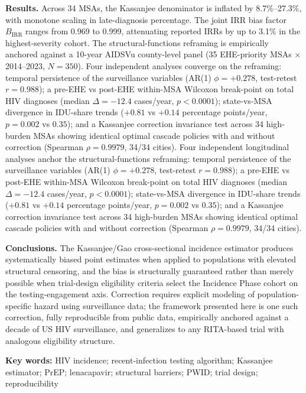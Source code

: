 \documentclass[12pt]{article}
\begin{document}
\medskip
\noindent\textbf{Results.} Across 34 MSAs, the Kassanjee denominator is inflated by 8.7\%--27.3\%, with monotone scaling in late-diagnosis percentage. The joint IRR bias factor $B_{\mathrm{IRR}}$ ranges from 0.969 to 0.999, attenuating reported IRRs by up to 3.1\% in the highest-severity cohort. The structural-functions reframing is empirically anchored against a 10-year AIDSVu county-level panel (35 EHE-priority MSAs $\times$ 2014--2023, $N = 350$). Four independent analyses converge on the reframing: temporal persistence of the surveillance variables (AR(1) $\phi = +0.278$, test-retest $r = 0.988$); a pre-EHE vs post-EHE within-MSA Wilcoxon break-point on total HIV diagnoses (median $\Delta = -12.4$ cases/year, $p < 0.0001$); state-vs-MSA divergence in IDU-share trends ($+0.81$ vs $+0.14$ percentage points/year, $p = 0.002$ vs $0.35$); and a Kassanjee correction invariance test across 34 high-burden MSAs showing identical optimal cascade policies with and without correction (Spearman $\rho = 0.9979$, 34/34 cities). Four independent longitudinal analyses anchor the structural-functions reframing: temporal persistence of the surveillance variables (AR(1) $\phi = +0.278$, test-retest $r = 0.988$); a pre-EHE vs post-EHE within-MSA Wilcoxon break-point on total HIV diagnoses (median $\Delta = -12.4$ cases/year, $p < 0.0001$); state-vs-MSA divergence in IDU-share trends ($+0.81$ vs $+0.14$ percentage points/year, $p = 0.002$ vs $0.35$); and a Kassanjee correction invariance test across 34 high-burden MSAs showing identical optimal cascade policies with and without correction (Spearman $\rho = 0.9979$, 34/34 cities).

\medskip
\noindent\textbf{Conclusions.} The Kassanjee/Gao cross-sectional incidence estimator produces systematically biased point estimates when applied to populations with elevated structural censoring, and the bias is structurally guaranteed rather than merely possible when trial-design eligibility criteria select the Incidence Phase cohort on the testing-engagement axis. Correction requires explicit modeling of population-specific hazard using surveillance data; the framework presented here is one such correction, fully reproducible from public data, empirically anchored against a decade of US HIV surveillance, and generalizes to any RITA-based trial with analogous eligibility structure.

\medskip
\noindent\textbf{Key words:} HIV incidence; recent-infection testing algorithm; Kassanjee estimator; PrEP; lenacapavir; structural barriers; PWID; trial design; reproducibility
\end{document}
